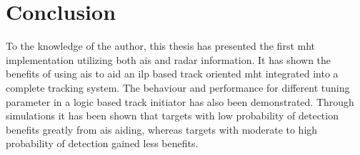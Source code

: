 
\chapter{Conclusion}\label{chapter:conclusion}
To the knowledge of the author, this thesis has presented the first \gls{mht} implementation utilizing both \gls{ais} and \gls{radar} information. It has shown the benefits of using \gls{ais} to aid an \gls{ilp} based track oriented \gls{mht} integrated into a complete tracking system. The behaviour and performance for different tuning parameter in a logic based track initiator has also been demonstrated.
Through simulations it has been shown that targets with low probability of detection benefits greatly from \gls{ais} aiding, whereas targets with moderate to high probability of detection gained less benefits. 